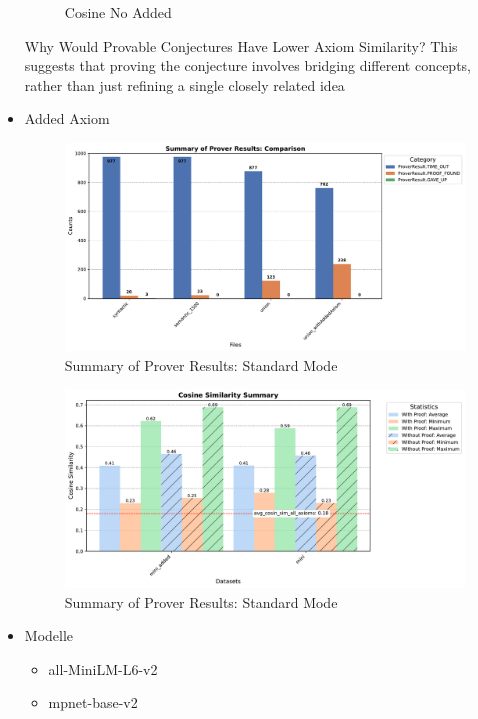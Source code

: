 \documentclass[german,version-2020-11]{uzl-thesis}
\begin{document}
\begin{itemize}
\begin{figure}[h!]
      \caption{Cosine No Added}
      \label{fig:prover_results_standard}
    \end{figure}
    Why Would Provable Conjectures Have Lower Axiom Similarity? This suggests that proving the conjecture involves bridging different concepts, rather than just refining a single closely related idea
    \clearpage
    \item Added Axiom
    \begin{figure}[h!]
      \centering
      \includegraphics[width=\textwidth]{standard_mode_output.pdf} %
      \caption{Summary of Prover Results: Standard Mode}
      \label{fig:prover_results_standard}
    \end{figure}
    \begin{figure}[h!]
      \centering
      \includegraphics[width=\textwidth]{cosine_similarity_mini_summary.pdf} %
      \caption{Summary of Prover Results: Standard Mode}
      \label{fig:prover_results_standard}
    \end{figure}
    \clearpage
    \item Modelle
    \begin{itemize}
      \item all-MiniLM-L6-v2
      \item mpnet-base-v2

\end{itemize}
\end{itemize}
\end{document}
